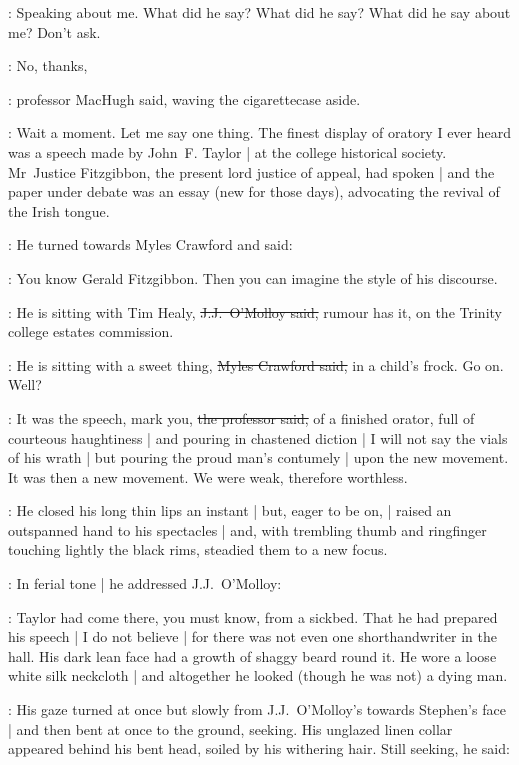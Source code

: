 \StephenInt:
Speaking about me.
What did he say?
What did he say?
What did he say about me?
Don't ask.

\machugh:
No, thanks,

:
professor MacHugh said,
waving the cigarettecase aside.

\machugh:
Wait a moment.
Let me say one thing.
The finest display of oratory I ever heard
was a speech made by John~F. Taylor |
at the college historical society.
Mr~Justice Fitzgibbon,
the present lord justice of appeal,
had spoken |
and the paper under debate was an essay
(new for those days),
advocating the revival of the Irish tongue.

:
He turned towards Myles Crawford and said:

\machugh:
You know Gerald Fitzgibbon.
Then you can imagine the style of his discourse.

\jjom:
He is sitting with Tim Healy,
\sout{J.J.~O'Molloy said,}
rumour has it,
on the Trinity college estates commission.

\crawford:
He is sitting with a sweet thing,
\sout{Myles Crawford said,}
in a child's frock.
Go on.
Well?

\machugh:
It was the speech,
mark you,
\sout{the professor said,}
of a finished orator,
full of courteous haughtiness |
and pouring in chastened diction |
I will not say the vials of his wrath |
but pouring the proud man's contumely |
upon the new movement.
It was then a new movement.
We were weak,
therefore worthless.

:
He closed his long thin lips an instant |
but, eager to be on, |
raised an outspanned hand to his spectacles |
and, with trembling thumb and ringfinger touching lightly the black rims,
steadied them to a new focus.



:
In ferial tone |
he addressed J.J.~O'Molloy:

\machugh:
Taylor had come there,
you must know,
from a sickbed.
That he had prepared his speech |
I do not believe |
for there was not even one shorthandwriter in the hall.
His dark lean face had a growth of shaggy beard round it.
He wore a loose white silk neckcloth |
and altogether he looked
(though he was not)
a dying man.

:
His gaze turned at once but slowly from J.J.~O'Molloy's
towards Stephen's face |
and then bent at once to the ground,
seeking.
His unglazed linen collar appeared behind his bent head,
soiled by his withering hair.
Still seeking,
he said:

